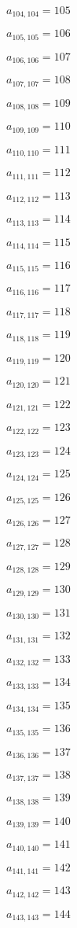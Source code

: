 \documentclass[a4paper,12pt]{article}
\begin{document}
$a _{ 104, 104 } = 105$

$a _{ 105, 105 } = 106$

$a _{ 106, 106 } = 107$

$a _{ 107, 107 } = 108$

$a _{ 108, 108 } = 109$

$a _{ 109, 109 } = 110$

$a _{ 110, 110 } = 111$

$a _{ 111, 111 } = 112$

$a _{ 112, 112 } = 113$

$a _{ 113, 113 } = 114$

$a _{ 114, 114 } = 115$

$a _{ 115, 115 } = 116$

$a _{ 116, 116 } = 117$

$a _{ 117, 117 } = 118$

$a _{ 118, 118 } = 119$

$a _{ 119, 119 } = 120$

$a _{ 120, 120 } = 121$

$a _{ 121, 121 } = 122$

$a _{ 122, 122 } = 123$

$a _{ 123, 123 } = 124$

$a _{ 124, 124 } = 125$

$a _{ 125, 125 } = 126$

$a _{ 126, 126 } = 127$

$a _{ 127, 127 } = 128$

$a _{ 128, 128 } = 129$

$a _{ 129, 129 } = 130$

$a _{ 130, 130 } = 131$

$a _{ 131, 131 } = 132$

$a _{ 132, 132 } = 133$

$a _{ 133, 133 } = 134$

$a _{ 134, 134 } = 135$

$a _{ 135, 135 } = 136$

$a _{ 136, 136 } = 137$

$a _{ 137, 137 } = 138$

$a _{ 138, 138 } = 139$

$a _{ 139, 139 } = 140$

$a _{ 140, 140 } = 141$

$a _{ 141, 141 } = 142$

$a _{ 142, 142 } = 143$

$a _{ 143, 143 } = 144$
\end{document}
